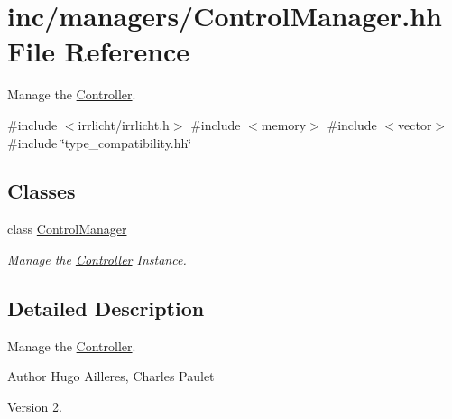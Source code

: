 \hypertarget{ControlManager_8hh}{}\section{inc/managers/\+Control\+Manager.hh File Reference}
\label{ControlManager_8hh}


Manage the \hyperlink{classController}{Controller}.  


{\ttfamily \#include $<$irrlicht/irrlicht.\+h$>$}\newline
{\ttfamily \#include $<$memory$>$}\newline
{\ttfamily \#include $<$vector$>$}\newline
{\ttfamily \#include \char`\"{}type\+\_\+compatibility.\+hh\char`\"{}}\newline
\subsection*{Classes}
\begin{DoxyCompactItemize}
\item 
class \hyperlink{classControlManager}{Control\+Manager}
\begin{DoxyCompactList}\small\item\em Manage the \hyperlink{classController}{Controller} Instance. \end{DoxyCompactList}\end{DoxyCompactItemize}


\subsection{Detailed Description}
Manage the \hyperlink{classController}{Controller}. 

\begin{DoxyAuthor}{Author}
Hugo Ailleres, Charles Paulet 
\end{DoxyAuthor}
\begin{DoxyVersion}{Version}
2. 
\end{DoxyVersion}
